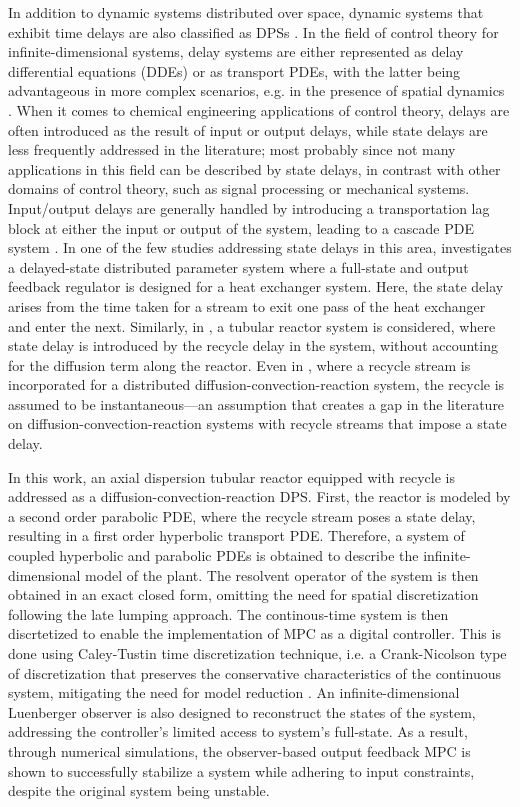 In addition to dynamic systems distributed over space, dynamic systems that exhibit time delays are also classified as DPSs \cite{curtainbook}. 
In the field of control theory for infinite-dimensional systems, delay systems are either represented as delay differential equations (DDEs) or as transport PDEs, with the latter being advantageous in more complex scenarios, e.g. in the presence of spatial dynamics \cite{krstic2009book}. 
When it comes to chemical engineering applications of control theory, delays are often introduced as the result of input or output delays, while state delays are less frequently addressed in the literature; most probably since not many applications in this field can be described by state delays, in contrast with other domains of control theory, such as signal processing or mechanical systems. 
Input/output delays are generally handled by introducing a transportation lag block at either the input or output of the system, leading to a cascade PDE system \cite{Hiratsuka1969IEEE, mohammadi2012lq, Guilherme2019ACC}. 
In one of the few studies addressing state delays in this area, \cite{ozorio2019heat} investigates a delayed-state distributed parameter system where a full-state and output feedback regulator is designed for a heat exchanger system. 
Here, the state delay arises from the time taken for a stream to exit one pass of the heat exchanger and enter the next. 
Similarly, in \cite{qi2021output}, a tubular reactor system is considered, where state delay is introduced by the recycle delay in the system, without accounting for the diffusion term along the reactor. 
Even in \cite{khatibi2021model}, where a recycle stream is incorporated for a distributed diffusion-convection-reaction system, the recycle is assumed to be instantaneous—an assumption that creates a gap in the literature on diffusion-convection-reaction systems with recycle streams that impose a state delay.

In this work, an axial dispersion tubular reactor equipped with recycle is addressed as a diffusion-convection-reaction DPS. First, the reactor is modeled by a second order parabolic PDE, where the recycle stream poses a state delay, resulting in a first order hyperbolic transport PDE. 
Therefore, a system of coupled hyperbolic and parabolic PDEs is obtained to describe the infinite-dimensional model of the plant. 
The resolvent operator of the system is then obtained in an exact closed form, omitting the need for spatial discretization following the late lumping approach. 
The continous-time system is then discrtetized to enable the implementation of MPC as a digital controller. This is done using Caley-Tustin time discretization technique, i.e. a Crank-Nicolson type of discretization that preserves the conservative characteristics of the continuous system, mitigating the need for model reduction \cite{havu2007cayley, xu2017linear}. 
An infinite-dimensional Luenberger observer is also designed to reconstruct the states of the system, addressing the controller's limited access to system's full-state. 
As a result, through numerical simulations, the observer-based output feedback MPC is shown to successfully stabilize a system while adhering to input constraints, despite the original system being unstable.
